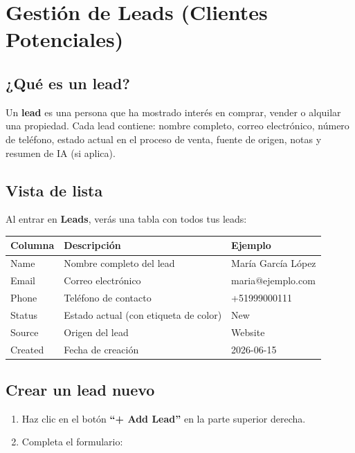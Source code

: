 \documentclass[12pt,oneside]{article}
\begin{document}
\section{Gestión de Leads (Clientes Potenciales)}

\subsection{¿Qué es un lead?}

Un \textbf{lead} es una persona que ha mostrado interés en comprar, vender o alquilar una propiedad. Cada lead contiene: nombre completo, correo electrónico, número de teléfono, estado actual en el proceso de venta, fuente de origen, notas y resumen de IA (si aplica).

\subsection{Vista de lista}

Al entrar en \textbf{Leads}, verás una tabla con todos tus leads:

\begin{tabularx}{\textwidth}{|X|X|X|}
\hline
\rowcolor{primary!10}
\textbf{Columna} & \textbf{Descripción} & \textbf{Ejemplo} \\
\hline
Name & Nombre completo del lead & María García López \\
\hline
Email & Correo electrónico & maria@ejemplo.com \\
\hline
Phone & Teléfono de contacto & +51999000111 \\
\hline
Status & Estado actual (con etiqueta de color) & New \\
\hline
Source & Origen del lead & Website \\
\hline
Created & Fecha de creación & 2026-06-15 \\
\hline
\end{tabularx}

\subsection{Crear un lead nuevo}

\begin{enumerate}[leftmargin=*]
  \item Haz clic en el botón \textbf{“+ Add Lead”} en la parte superior derecha.
  \item Completa el formulario:
\end{enumerate}
\end{document}

